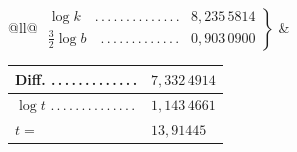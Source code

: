 \begin{center}
\footnotesize
\begin{tabular}{@{}ll@{}}
$\left.\begin{array}{ll}
\log k\quad .\,.\,.\,.\,.\,.\,.\,.\,.\,.\,.\,.\,.\,. &8{,}235\,5814\\[.3em]
\frac{3}{2}\log b\quad .\,.\,.\,.\,.\,.\,.\,.\,.\,.\,.\,.\,. &0{,}903\,0900
\end{array}\right\}$ & \begin{tabular}{@{}ll@{}}
Diff. .\,.\,.\,.\,.\,.\,.\,.\,.\,.\,.\,.\,. & $7{,}332\,4914$\\[.3em]
\hline
$\log t$ .\,.\,.\,.\,.\,.\,.\,.\,.\,.\,.\,.\,.\,. & $1{,}143\,4661$\\[.3em]
$t=$ & $13{,}91445$
\end{tabular}
\end{tabular}
\end{center}
